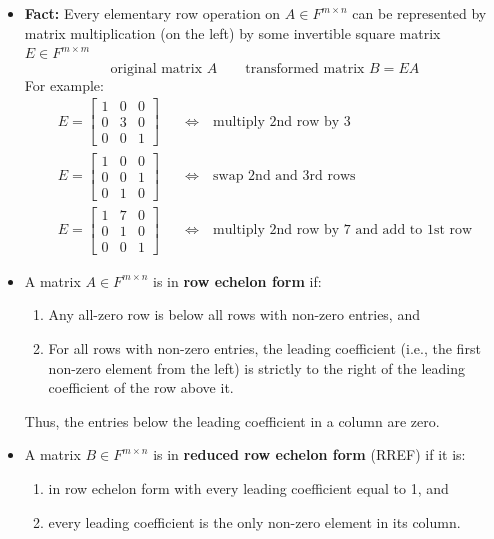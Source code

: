 \documentclass[11pt,twoside]{report}
\begin{document}
\begin{itemize}
\item \textbf{Fact:}  Every elementary row operation on $A \in F^{m \times n}$ can be represented by matrix multiplication (on the left) by some invertible square matrix $E \in F^{m \times m}$
\[
\text{original matrix $A$}  \qquad  \text{transformed matrix $B = EA$}
\]
For example: 
\begin{align*}
E =  \begin{bmatrix}
1 & 0 & 0 \\
0 & 3 & 0 \\
0 & 0 & 1 
\end{bmatrix} \quad &\iff \quad \text{multiply 2nd row by 3} \\
E =  \begin{bmatrix}
1 & 0 & 0 \\
0 & 0 & 1 \\
0 & 1 & 0  
\end{bmatrix} \quad &\iff \quad \text{swap 2nd and 3rd rows} \\
E =  \begin{bmatrix}
1 & 7 & 0 \\
0 & 1 & 0 \\
0 & 0 & 1  
\end{bmatrix} \quad &\iff \quad \text{multiply 2nd row by 7 and add to 1st row} 
\end{align*}


  
  \item A matrix $A \in F^{m\times n}$ is in \textbf{row echelon form} if:
\begin{enumerate}
\item Any all-zero row is below all rows with non-zero entries, and
\item For all rows with non-zero entries, the leading coefficient (i.e., the first non-zero element from the left) is strictly to the right of the leading coefficient of the row above it.
\end{enumerate}
Thus, the entries below the leading coefficient in a column are zero. %


\item  A matrix $B \in F^{m\times n}$ is in \textbf{reduced row echelon form} (RREF) if it is:
\begin{enumerate}
\item in row echelon form with every leading coefficient equal to 1, and
\item every leading coefficient is the only non-zero element in its column.
\end{enumerate}



\end{itemize}
\end{document}
